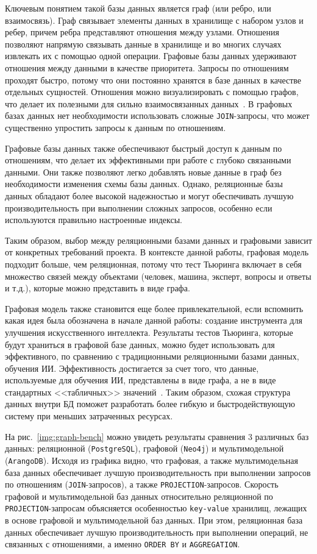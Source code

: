 Ключевым понятием такой базы данных является граф (или ребро, или взаимосвязь).
Граф связывает элементы данных в хранилище с набором узлов и ребер, причем ребра представляют отношения между узлами. 
Отношения позволяют напрямую связывать данные в хранилище и во многих случаях извлекать их с помощью одной операции. 
Графовые базы данных удерживают отношения между данными в качестве приоритета.
Запросы по отношениям проходят быстро, потому что они постоянно хранятся в базе данных в качестве отдельных сущностей.
Отношения можно визуализировать с помощью графов, что делает их полезными для сильно взаимосвязанных данных~\cite{graph-exp}.
В графовых базах данных нет необходимости использовать сложные \texttt{JOIN}-запросы, что может существенно упростить запросы к данным по отношениям.

Графовые базы данных также обеспечивают быстрый доступ к данным по отношениям, что делает их эффективными при работе с глубоко связанными данными. Они также позволяют легко добавлять новые данные в граф без необходимости изменения схемы базы данных.
Однако, реляционные базы данных обладают более высокой надежностью и могут обеспечивать лучшую производительность при выполнении сложных запросов, особенно если используются правильно настроенные индексы.

Таким образом, выбор между реляционными базами данных и графовыми зависит от конкретных требований проекта.
В контексте данной работы, графовая модель подходит больше, чем реляционная, потому что тест Тьюринга включает в себя множество связей между объектами (человек, машина, эксперт, вопросы и ответы и т.д.), которые можно представить в виде графа.

Графовая модель также становится еще более привлекательной, если вспомнить какая идея была обозначена в начале данной работы: создание инструмента для улучшения искусственного интеллекта.
Результаты тестов Тьюринга, которые будут храниться в графовой базе данных, можно будет использовать для эффективного, по сравнению с традиционными реляционными базами данных, обучения ИИ. 
Эффективность достигается за счет того, что данные, используемые для обучения ИИ, представлены в виде графа, а не в виде стандартных <<табличных>> значений~\cite{besta2022neural}. 
Таким образом, схожая структура данных внутри БД поможет разработать более гибкую и быстродействующую систему при меньших затраченных ресурсах.

На рис.~\ref{img:graph-bench} можно увидеть результаты сравнения 3 различных баз данных: реляционной (\texttt{PostgreSQL}), графовой (\texttt{Neo4j}) и мультимодельной (\texttt{ArangoDB}). 
Исходя из графика видно, что графовая, а также мультимодельная база данных обеспечивает лучшую производительность при выполнении запросов по отношениям (\texttt{JOIN}-запросов), а также \texttt{PROJECTION}-запросов. 
Скорость графовой и мультимодельной баз данных относительно реляционной по \texttt{PROJECTION}-запросам объясняется особенностью \texttt{key-value} хранилищ, лежащих в основе графовой и мультимодельной баз данных.
При этом, реляционная база данных обеспечивает лучшую производительность при выполнении операций, не связанных с отношениями, а именно \texttt{ORDER BY} и \texttt{AGGREGATION}.

